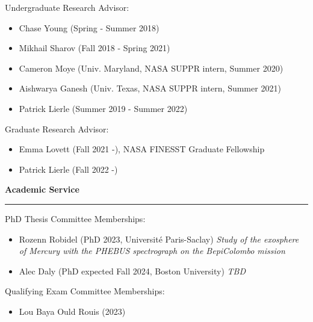 \documentclass[12pt]{report}
\begin{document}
\noindent Undergraduate Research Advisor: 
\begin{itemize} \itemsep -2pt 
	\item Chase Young (Spring - Summer 2018)
	\item Mikhail Sharov (Fall 2018 - Spring 2021)
	\item Cameron Moye (Univ. Maryland, NASA SUPPR intern, Summer 2020)
	\item Aishwarya Ganesh (Univ. Texas, NASA SUPPR intern, Summer 2021)
	\item Patrick Lierle (Summer 2019 - Summer 2022)
\end{itemize}
\noindent Graduate Research Advisor: 
\begin{itemize} \itemsep -2pt
	\item Emma Lovett (Fall 2021 -), NASA FINESST Graduate Fellowship
	\item Patrick Lierle (Fall 2022 -) 
\end{itemize}

\vspace{2 mm}
\noindent \bf{Academic Service}\rm \hspace*{\fill} \\
\rule{\textwidth}{1pt}

\noindent PhD Thesis Committee Memberships:
\begin{itemize} \itemsep -2pt
	\item Rozenn Robidel (PhD 2023, Université Paris-Saclay) \textit{Study of the exosphere of Mercury with the PHEBUS spectrograph on the BepiColombo mission}
	\item Alec Daly (PhD expected Fall 2024, Boston University) \textit{TBD}
\end{itemize}

\noindent Qualifying Exam Committee Memberships:
\begin{itemize} \itemsep -2pt
	\item Lou Baya Ould Rouis (2023)
\end{itemize}
\end{document}
